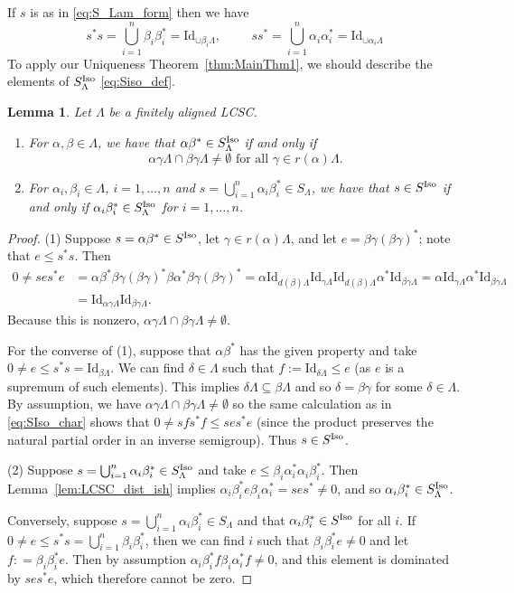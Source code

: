 \documentclass[12pt]{amsart}
\newtheorem{lemma}[thm]{Lemma}
\theoremstyle{definition}
\theoremstyle{remark}
\numberwithin{equation}{section}
\newcommand{\Id}{\text{Id}}
\renewcommand{\L}{\Lambda}
\renewcommand{\a}{\alpha}
\renewcommand{\b}{\beta}
\newcommand{\Iso}{\textup{Iso}}
\newcommand{\ga}{\gamma}
\newcommand{\de}{\delta}
\begin{document}
		 
		 If $s$ is as in \eqref{eq:S_Lam_form} then we have
		 \[
		 s^*s = \bigcup_{i=1}^{n}\b_i\b_i^* = \Id_{\cup \b_i\L}, \hspace{1cm} ss^* = \bigcup_{i=1}^{n}\a_i\a_i^* = \Id_{\cup \a_i\L}
		 \]
To apply our Uniqueness Theorem~\ref{thm:MainThm1}, we should describe the elements of $S_\L^\Iso$ \eqref{eq:Siso_def}.
	\begin{lemma}\label{lem:SIsodef}
		Let $\L$ be a finitely aligned LCSC. 
		\begin{enumerate}
			\item For $\a, \b\in\L$, we have that $\a \b^*\in S_\L^\Iso$ if and only if \[
			\a\gamma\L \cap \b\gamma\L \neq \emptyset\text{ for all }\gamma\in r(\a)\L.
			\]
			\item For $\a_i, \b_i\in\L$, $i=1, \dots, n$ and $s = \bigcup_{i=1}^{n}\a_i\b_i^*\in S_\L$, we have that $s\in S^\Iso$ if and only if $\a_i\b_i^* \in S_\L^\Iso$ for $ i = 1, \dots, n$. 
		\end{enumerate}
	\end{lemma}
	\begin{proof}
		(1) Suppose $s = \a \b^*\in S^\Iso$, let $\gamma\in r(\a)\L$, and let $ e = \b\ga (\b\ga)^*$; note that $e\leq s^*s$. Then 
		\begin{align}
		0\neq  ses^*e &= \a \b^*\b\gamma(\b\gamma)^* \b \a^*\b\gamma(\b\gamma)^* = \a\Id_{d(\b)\L} \Id_{\gamma\L}\Id_{d(\b)\L}\a^*\Id_{\b\gamma\L}=\a\Id_{\gamma\L}\a^*\Id_{\b\gamma\L} \nonumber\\
		&= \Id_{\a\gamma\L}\Id_{\b\gamma\L}\label{eq:SIso_char}.
		\end{align}
		Because this is nonzero, $\a\gamma\L \cap \b\gamma\L \neq \emptyset$. 
		
		For the converse of (1), suppose that $\a\b^*$ has the given property and take $0\neq e\leqslant s^*s = \Id_{\b\L}$. We can find $\de\in\L$ such that $f:= \Id_{\de\L}\leqslant e$ (as $e$ is a supremum of such elements). This implies $\de\L\subseteq\b\L$ and so $\de = \b\ga$ for some $\delta\in\L$. By assumption, we have $\a\gamma\L \cap \b\gamma\L \neq \emptyset$ so the same calculation as in \eqref{eq:SIso_char} shows that $0\neq sfs^*f\leqslant ses^*e$ (since the product preserves the natural partial order in an inverse semigroup). Thus $s\in S^\Iso$. 
		
		(2) 	 Suppose $s = \bigcup_{i=1}^{n}\a_i\b_i^*\in S_\L^\Iso$ and take $e\leqslant \b_i\a_i^*\a_i\b_i^*$. Then Lemma~\ref{lem:LCSC_dist_ish} implies $\a_i\b_i^*e\b_i\a_i^*  = ses^*\neq 0$, and so $\a_i\b_i^*\in S_\L^\Iso$. 
		 
		 Conversely, suppose $s = \bigcup_{i=1}^{n}\a_i\b_i^*\in S_\L$ and that $\a_i\b_i^*\in S^\Iso$ for all $i$. If $0\neq e\leqslant s^*s = \bigcup_{i=1}^{n}\b_i\b_i^*$, then we can find $i$ such that $\b_i\b_i^* e\neq 0$ and let $f : = \b_i\b_i^* e$. Then by assumption $\a_i\b_i^*f\b_i\a_i^*f\neq 0$, and this element is dominated by $ses^*e$, which therefore cannot be zero. 
	\end{proof}
	
\end{document}
